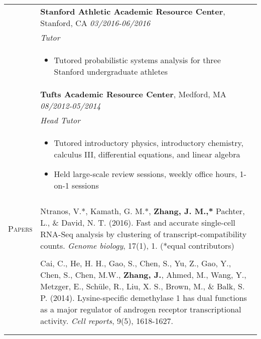 \documentclass[letterpaper,11pt,oneside]{article}
\begin{document}
\begin{longtable}{@{} p{2.5cm} p{14.8cm}}
& \textbf{Stanford Athletic Academic Resource Center}, Stanford, CA \hfill \textit{03/2016-06/2016} \\
& \textit{Tutor} \\ 
& 
\vspace{-7mm}
\begin{itemize}[leftmargin=.5cm]
	\setlength\itemsep{-0.3em}
	\item Tutored probabilistic systems analysis for three Stanford undergraduate athletes
\end{itemize} 
\\

& \textbf{Tufts Academic Resource Center}, Medford, MA \hfill \textit{08/2012-05/2014} \\*
& \textit{Head Tutor} \\*
& 
\vspace{-7mm}
\begin{itemize}[leftmargin=.5cm]
	\setlength\itemsep{-0.3em}
	\item Tutored introductory physics, introductory chemistry, calculus III, differential equations, and linear algebra
	\item Held large-scale review sessions, weekly office hours, 1-on-1 sessions
\end{itemize} 
\\
& \\
     
 \large{\textsc{Papers}}    & Ntranos, V.*, Kamath, G. M.*, \textbf{Zhang, J. M.,*} Pachter, L., \& David, N. T. (2016). Fast and accurate single-cell RNA-Seq analysis by clustering of transcript-compatibility counts. \textit{Genome biology}, 17(1), 1. (*equal contributors) \\
     & \\
     & Cai, C., He, H. H., Gao, S., Chen, S., Yu, Z., Gao, Y., Chen, S., Chen, M.W., \textbf{Zhang, J.}, Ahmed, M., Wang, Y., Metzger, E., Sch\"{u}le, R., Liu, X. S., Brown, M., \& Balk, S. P. (2014). Lysine-specific demethylase 1 has dual functions as a major regulator of androgen receptor transcriptional activity. \textit{Cell reports}, 9(5), 1618-1627. \\
     & \\ 
     & \\
    


\end{longtable}
\end{document}
